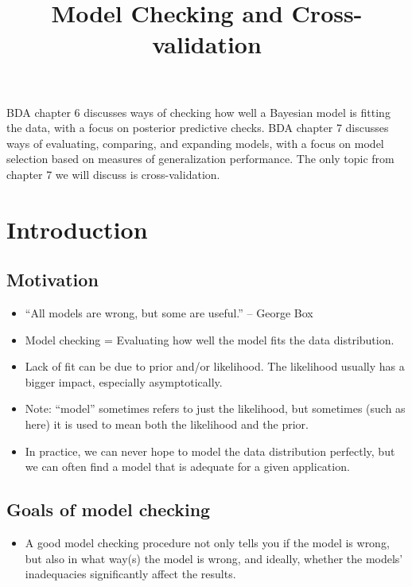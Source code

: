 \documentclass[12pt]{article}
\title{Model Checking and Cross-validation}
\author{}
\date{}
\begin{document}
\maketitle
\tableofcontents
\thispagestyle{firststyle}

\vspace{2em}

BDA chapter 6 discusses ways of checking how well a Bayesian model is fitting the data, with a focus on posterior predictive checks. BDA chapter 7 discusses ways of evaluating, comparing, and expanding models, with a focus on model selection based on measures of generalization performance. The only topic from chapter 7 we will discuss is cross-validation.

\newpage

\section{Introduction}

\subsection*{Motivation}
\begin{itemize}
\item ``All models are wrong, but some are useful.'' -- George Box
\item Model checking = Evaluating how well the model fits the data distribution.
\item Lack of fit can be due to prior and/or likelihood. The likelihood usually has a bigger impact, especially asymptotically.
\item Note: ``model'' sometimes refers to just the likelihood, but sometimes (such as here) it is used to mean both the likelihood and the prior.
\item In practice, we can never hope to model the data distribution perfectly, but we can often find a model that is adequate for a given application.
\end{itemize}

\subsection*{Goals of model checking}
\begin{itemize}
\item A good model checking procedure not only tells you if the model is wrong, but also in what way(s) the model is wrong, and ideally, whether the models' inadequacies significantly affect the results.
\end{itemize}
\end{document}
